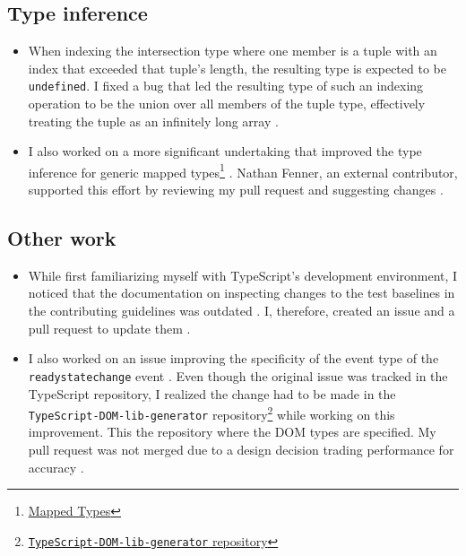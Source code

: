 \documentclass[12pt]{scrartcl}
\def\code#1{\texttt{\frenchspacing#1}}
\begin{document}
\subsection{Type inference}

\begin{itemize}
    \item When indexing the intersection type where one member is a tuple with an index that exceeded that tuple's length, the resulting type is expected to be \code{undefined}. I fixed a bug that led the resulting type of such an indexing operation to be the union over all members of the tuple type, effectively treating the tuple as an infinitely long array \cite{42557,42602}.
    \item I also worked on a more significant undertaking that improved the type inference for generic mapped types\footnote{\href{https://www.typescriptlang.org/docs/handbook/2/mapped-types.html}{Mapped Types}} \cite{37670,42382}. Nathan Fenner, an external contributor, supported this effort by reviewing my pull request and suggesting changes \cite{42382Comment}.
\end{itemize}

\subsection{Other work}

\begin{itemize}
    \item While first familiarizing myself with TypeScript's development environment, I noticed that the documentation on inspecting changes to the test baselines in the contributing guidelines was outdated \cite{ContributingGuidelines}. I, therefore, created an issue and a pull request to update them \cite{41991,42031}.
    \item I also worked on an issue improving the specificity of the event type of the \code{readystatechange} event \cite{41775}. Even though the original issue was tracked in the TypeScript repository, I realized the change had to be made in the \code{TypeScript-DOM-lib-generator} repository\footnote{\href{https://github.com/microsoft/TypeScript-DOM-lib-generator}{\code{TypeScript-DOM-lib-generator} repository}} while working on this improvement. This the repository where the DOM types are specified. My pull request was not merged due to a design decision trading performance for accuracy \cite{969Comment}.
\end{itemize}
\end{document}
